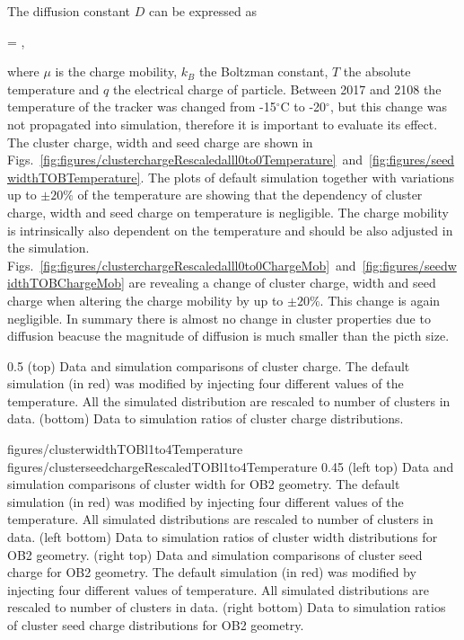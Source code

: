 The diffusion constant $D$ can be expressed as

{
   =  ,
}

where $\mu$ is the charge mobility, $k_{B}$ the Boltzman constant, $T$ the absolute temperature and $q$ the electrical charge of particle. Between 2017 and 2108 the temperature of the tracker was changed from -15$^{\circ}$C to -20$^{\circ}$, but this change was not propagated into simulation, therefore it is important to evaluate its effect. The cluster charge, width and seed charge are shown in Figs.~\ref{fig:figures/clusterchargeRescaledalll0to0Temperature}~and~\ref{fig:figures/seedwidthTOBTemperature}. The plots of default simulation together with variations up to $\pm 20\%$ of the temperature are showing that the dependency of cluster charge, width and seed charge on temperature is negligible. The charge mobility is intrinsically also dependent on the temperature and should be also adjusted in the simulation. Figs.~\ref{fig:figures/clusterchargeRescaledalll0to0ChargeMob}~and~\ref{fig:figures/seedwidthTOBChargeMob} are revealing a change of cluster charge, width and seed charge when altering the charge mobility by up to $\pm 20\%$. This change is again negligible. In summary there is almost no change in cluster properties due to diffusion beacuse the magnitude of diffusion is much smaller than the picth size.


                 {0.5}       %
                 { (top) Data and simulation comparisons of cluster charge. The default simulation (in red) was modified by injecting four different values of the temperature. All the simulated distribution are rescaled to number of clusters in data. (bottom) Data to simulation ratios of cluster charge distributions. }

                 {figures/clusterwidthTOBl1to4Temperature}
                 {figures/clusterseedchargeRescaledTOBl1to4Temperature} %
                 {0.45}       %
                 {(left top) Data and simulation  comparisons of cluster width for OB2 geometry. The default simulation (in red) was modified by injecting four different values of the temperature. All simulated distributions are rescaled to number of clusters in data. (left bottom) Data to simulation ratios of cluster width distributions for OB2 geometry. (right top) Data and simulation  comparisons of cluster seed charge for OB2 geometry. The default simulation (in red) was modified by injecting four different values of temperature. All simulated distributions are rescaled to number of clusters in data. (right bottom) Data to simulation ratios of cluster seed charge distributions for OB2 geometry. }

